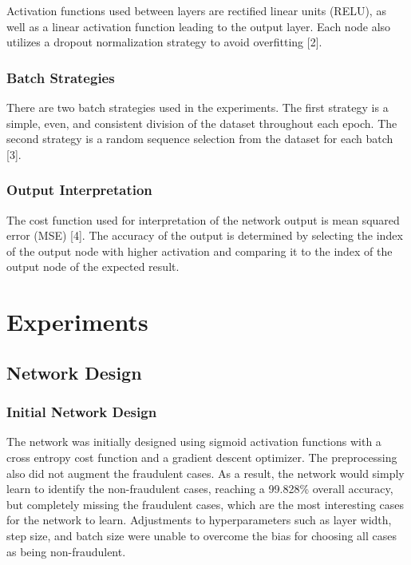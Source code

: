 \documentclass{article}
\begin{document}
 Activation functions used between layers are rectified linear units (RELU), as well as a linear 
 activation function leading to the output layer. Each node also utilizes a dropout normalization
 strategy to avoid overfitting [2].

\subsubsection{Batch Strategies}

 There are two batch strategies used in the experiments. The first strategy is a simple, 
 even, and consistent division of the dataset throughout each epoch. The second strategy 
 is a random sequence selection from the dataset for each batch [3].

\subsubsection{Output Interpretation}

 The cost function used for interpretation of the network output is mean squared error (MSE) [4]. 
 The accuracy of the output is determined by selecting the index of the output node with higher 
 activation and comparing it to the index of the output node of the expected result.

\section{Experiments}

\subsection{Network Design}

\subsubsection{Initial Network Design}

 The network was initially designed using sigmoid activation functions with a cross entropy 
 cost function and a gradient descent optimizer. The preprocessing also did not augment 
 the fraudulent cases. As a result, the network would simply learn to identify the non-fraudulent 
 cases, reaching a 99.828\% overall accuracy, but completely missing the fraudulent cases, 
 which are the most interesting cases for the network to learn. Adjustments to hyperparameters 
 such as layer width, step size, and batch size were unable to overcome the bias for choosing all 
 cases as being non-fraudulent.
\end{document}
